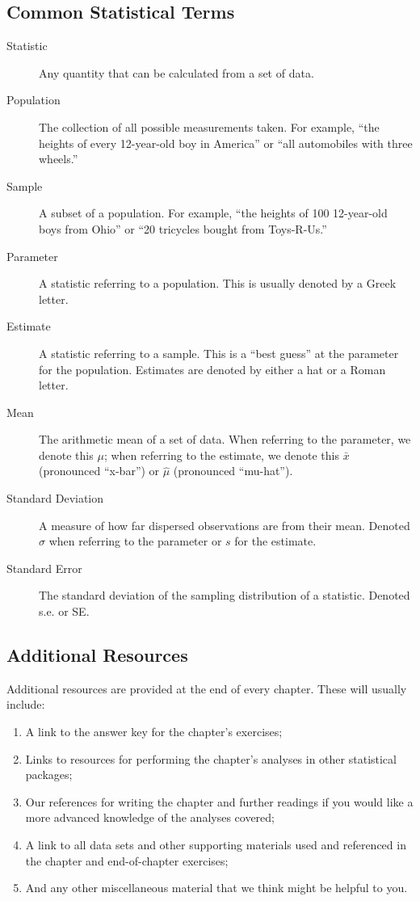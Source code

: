 \subsection{Common Statistical Terms}
\begin{description}
\item[Statistic]{Any quantity that can be calculated from a set of data.}
\item[Population]{The collection of all possible measurements taken. For example, ``the heights of every 12-year-old boy in America'' or ``all automobiles with three wheels.''}
\item[Sample]{A subset of a population. For example, ``the heights of 100 12-year-old boys from Ohio'' or ``20 tricycles bought from Toys-R-Us.''}
\item[Parameter]{A statistic referring to a population. This is usually denoted by a Greek letter.}
\item[Estimate]{A statistic referring to a sample. This is a ``best guess'' at the parameter for the population. Estimates are denoted by either a hat or a Roman letter.}
\item[Mean]{The arithmetic mean of a set of data. When referring to the parameter, we denote this $\mu$; when referring to the estimate, we denote this $\bar{x}$ (pronounced ``x-bar'') or $\hat{\mu}$ (pronounced ``mu-hat'').}
\item[Standard Deviation]{A measure of how far dispersed observations are from their mean. Denoted $\sigma$ when referring to the parameter or $s$ for the estimate.}
\item[Standard Error]{The standard deviation of the sampling distribution of a statistic. Denoted s.e. or SE.}
\end{description}

\subsection{Additional Resources}
Additional resources are provided at the end of every chapter. These will usually include:
\begin{enumerate}
	\item A link to the answer key for the chapter's exercises;
	\item Links to resources for performing the chapter's analyses in other statistical packages;
	\item Our references for writing the chapter and further readings if you would like a more advanced knowledge of the analyses covered;
	\item A link to all data sets and other supporting materials used and referenced in the chapter and end-of-chapter exercises;
	\item And any other miscellaneous material that we think might be helpful to you.
\end{enumerate}

\mainmatter